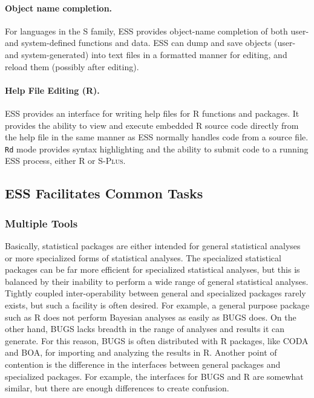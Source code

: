 \documentclass{article}
\newcommand*{\Splus}{\textsc{S-Plus}}
\newcommand{\stexttt}[1]{{\small\texttt{#1}}}
\begin{document}
\paragraph{Object name completion.}
For languages in the S family,
ESS provides object-name completion of both user- and
system-defined functions and data.  ESS can dump and save objects
(user- and system-generated) into text files in a formatted manner for
editing, and reload them (possibly after editing).

\paragraph{Help File Editing (R).}
ESS provides an interface for writing help files for R functions
and packages.  It provides the ability to view and execute embedded R
source code directly from the help file in the same manner as ESS
normally handles code from a source file.  \stexttt{Rd} mode provides
syntax highlighting and the ability to submit code to a running ESS
process, either R or \Splus.


\subsection{ESS Facilitates Common Tasks}
\label{sec:ess-facil-comm}

\subsubsection{Multiple Tools}
\label{sec:multiple-tools}

Basically, statistical packages are either intended for general 
statistical analyses or more specialized forms of statistical analyses.  
The specialized statistical packages can be far more efficient for
specialized statistical analyses, but this is balanced by their inability
to perform a wide range of general statistical analyses.  Tightly coupled 
inter-operability between general and specialized packages rarely exists, 
but such a facility is often desired.  For example, a general purpose 
package such as R does not perform Bayesian analyses as easily as BUGS does.  
On the other hand, BUGS lacks breadth in the range of analyses and results 
it can generate.  For this reason, BUGS is often distributed with R packages, 
like CODA and BOA, for importing and analyzing the results in R.  Another
point of contention is the difference in the interfaces between general
packages and specialized packages.  For example, the interfaces for BUGS 
and R are somewhat similar, but there are enough differences to create confusion.
\end{document}
